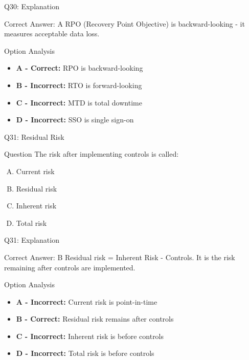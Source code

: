 \documentclass{beamer}
\begin{document}
	\begin{frame}{Q30: Explanation}
		\begin{block}{Correct Answer: A}
			RPO (Recovery Point Objective) is backward-looking - it measures acceptable data loss.
		\end{block}
		\begin{block}{Option Analysis}
			\begin{itemize}
				\item \textbf{A - Correct:} RPO is backward-looking
				\item \textbf{B - Incorrect:} RTO is forward-looking
				\item \textbf{C - Incorrect:} MTD is total downtime
				\item \textbf{D - Incorrect:} SSO is single sign-on
			\end{itemize}
		\end{block}
	\end{frame}
	
	\begin{frame}{Q31: Residual Risk}
		\begin{block}{Question}
			The risk after implementing controls is called:
		\end{block}
		\begin{enumerate}[(A)]
			\item Current risk
			\item Residual risk
			\item Inherent risk
			\item Total risk
		\end{enumerate}
	\end{frame}
	
	\begin{frame}{Q31: Explanation}
		\begin{block}{Correct Answer: B}
			Residual risk = Inherent Risk - Controls. It is the risk remaining after controls are implemented.
		\end{block}
		\begin{block}{Option Analysis}
			\begin{itemize}
				\item \textbf{A - Incorrect:} Current risk is point-in-time
				\item \textbf{B - Correct:} Residual risk remains after controls
				\item \textbf{C - Incorrect:} Inherent risk is before controls
				\item \textbf{D - Incorrect:} Total risk is before controls
			\end{itemize}
		\end{block}
	\end{frame}
	
\end{document}
